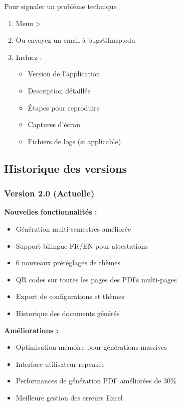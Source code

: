 Pour signaler un problème technique :

\begin{enumerate}[leftmargin=*]
    \item Menu  > 
    \item Ou envoyez un email à bugs@fmsp.edu
    \item Incluez :
    \begin{itemize}
        \item Version de l'application
        \item Description détaillée
        \item Étapes pour reproduire
        \item Captures d'écran
        \item Fichiers de logs (si applicable)
    \end{itemize}
\end{enumerate}

\subsection{Historique des versions}

\subsubsection{Version 2.0 (Actuelle)}

\textbf{Nouvelles fonctionnalités :}
\begin{itemize}[leftmargin=*]
    \item Génération multi-semestres améliorée
    \item Support bilingue FR/EN pour attestations
    \item 6 nouveaux préréglages de thèmes
    \item QR codes sur toutes les pages des PDFs multi-pages
    \item Export de configurations et thèmes
    \item Historique des documents générés
\end{itemize}

\textbf{Améliorations :}
\begin{itemize}[leftmargin=*]
    \item Optimisation mémoire pour générations massives
    \item Interface utilisateur repensée
    \item Performances de génération PDF améliorées de 30\%
    \item Meilleure gestion des erreurs Excel
\end{itemize}

